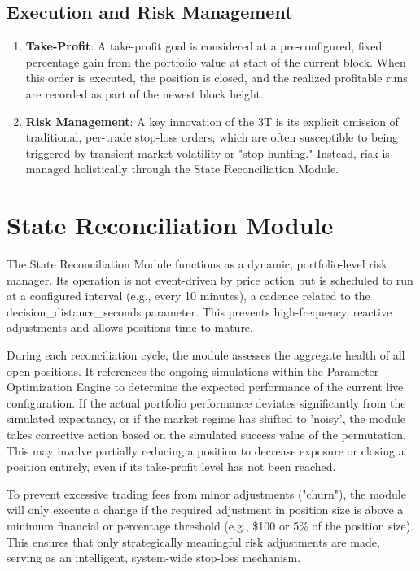 \documentclass[11pt]{article}
\begin{document}
{\subsection{Execution and Risk Management}
\begin{enumerate}
    \item \textbf{Take-Profit}: A take-profit goal is considered at a pre-configured, fixed percentage gain from the portfolio value at start of the current block. When this order is executed, the position is closed, and the realized profitable runs are recorded as part of the newest block height.
    \item \textbf{Risk Management}: A key innovation of the 3T is its explicit omission of traditional, per-trade stop-loss orders, which are often susceptible to being triggered by transient market volatility or "stop hunting." Instead, risk is managed holistically through the State Reconciliation Module.
\end{enumerate}

\section{State Reconciliation Module}
The State Reconciliation Module functions as a dynamic, portfolio-level risk manager. Its operation is not event-driven by price action but is scheduled to run at a configured interval (e.g., every 10 minutes), a cadence related to the decision\_distance\_seconds parameter. This prevents high-frequency, reactive adjustments and allows positions time to mature.

During each reconciliation cycle, the module assesses the aggregate health of all open positions. It references the ongoing simulations within the Parameter Optimization Engine to determine the expected performance of the current live configuration. If the actual portfolio performance deviates significantly from the simulated expectancy, or if the market regime has shifted to 'noisy', the module takes corrective action based on the simulated success value of the permutation. This may involve partially reducing a position to decrease exposure or closing a position entirely, even if its take-profit level has not been reached.

To prevent excessive trading fees from minor adjustments ("churn"), the module will only execute a change if the required adjustment in position size is above a minimum financial or percentage threshold (e.g., \$100 or 5\% of the position size). This ensures that only strategically meaningful risk adjustments are made, serving as an intelligent, system-wide stop-loss mechanism. 

}
\end{document}
